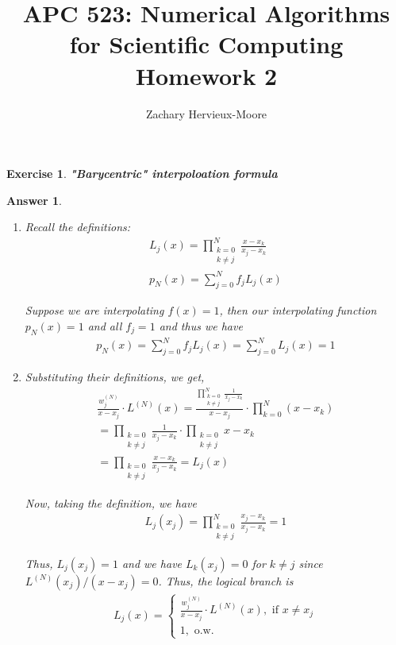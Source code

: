 \documentclass[12pt]{article}
\title{APC 523: Numerical Algorithms for Scientific Computing \\ Homework 2}
\author{Zachary Hervieux-Moore}
\date{\displaydate{date}}
\theoremstyle{colon}
\newtheorem{exercise}{Exercise}
\newtheorem*{answer}{Answer}
\begin{document}
\maketitle

\clearpage

\begin{exercise}
  \textbf{"Barycentric" interpoloation formula}
\end{exercise}

\begin{answer}
  \begin{enumerate}[label=\alph*)]
    \item Recall the definitions:
      \begin{gather*}
        L_j(x) = \prod_{\substack{k = 0 \\ k \neq j}}^N \frac{x - x_k}{x_j - x_k} \\
        p_N(x) = \sum_{j=0}^N f_j L_j(x)
      \end{gather*}

      Suppose we are interpolating $f(x) = 1$, then our interpolating function $p_N(x) = 1$ and all $f_j = 1$ and thus we have
      \begin{gather*}
        p_N(x) = \sum_{j=0}^N f_j L_j(x) = \sum_{j=0}^N L_j(x) = 1
      \end{gather*}

    \item Substituting their definitions, we get,
      \begin{gather*}
        \frac{w_j^{(N)}}{x-x_j} \cdot L^{(N)}(x) = \frac{\prod_{\substack{k = 0 \\ k \neq j}}^N \frac{1}{x_j - x_k}}{x - x_j} \cdot \prod_{k=0}^N (x - x_k) \\
        = \prod_{\substack{k = 0 \\ k \neq j}} \frac{1}{x_j - x_k} \cdot \prod_{\substack{k = 0 \\ k \neq j}} x - x_k \\
        = \prod_{\substack{k = 0 \\ k \neq j}} \frac{x - x_k}{x_j - x_k} = L_j(x)
      \end{gather*}

      Now, taking the definition, we have
      \begin{gather*}
        L_j(x_j) = \prod_{\substack{k = 0 \\ k \neq j}}^N \frac{x_j - x_k}{x_j - x_k} = 1
      \end{gather*}

      Thus, $L_j(x_j)=1$ and we have $L_k(x_j) = 0$ for $k \neq j$  since $L^{(N)}(x_j)/(x-x_j) = 0$. Thus, the logical branch is
      \begin{gather*}
        L_j(x) = \begin{cases}
          \frac{w_j^{(N)}}{x-x_j} \cdot L^{(N)}(x), \text{ if } x \neq x_j \\
          1, \text{ o.w.}
        \end{cases}
      \end{gather*}


\end{enumerate}
\end{answer}
\end{document}
